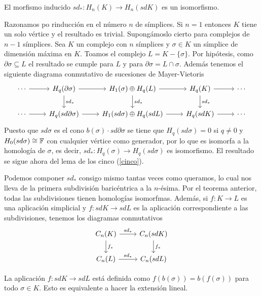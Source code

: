 \documentclass[HS.tex]{subfiles}
\begin{document}
\begin{teorema}
El morfismo inducido $sd_*:H_n(K)\to H_n(sdK)$ es un isomorfismo.
\end{teorema}
\begin{dem}
Razonamos po rinducción en el número $n$ de símplices. Si $n=1$ entonces $K$ tiene un solo vértice y el resultado es trivial. Supongámoslo cierto para complejos de $n-1$ símplices. Sea $K$ un complejo con $n$ símplices y $\sigma\in K$ un símplice de dimensión máxima en $K$. Toamos el complejo $L=K-\{\sigma\}$. Por hipótesis, como $\partial\sigma\subseteq L$ el resultado se cumple para $L$ y para $\partial\sigma=L\cap\sigma$. Además tenemos el siguiente diagrama conmutativo de sucesiones de Mayer-Vietoris
\[
\begin{tikzcd}
\cdots\arrow[r] & H_q(\partial\sigma)\arrow[r]\arrow[d,"sd_*"] & H_1(\sigma)\oplus H_q(L)\arrow[r]\arrow[d, "sd_*"] & H_q(K)\arrow[d, "sd_*"]\arrow[r]&\cdots \\
\cdots\arrow[r] & H_q(sd\partial\sigma)\arrow[r]& H_1(sd\sigma)\oplus H_q(sdL)\arrow[r] & H_q(sdK)\arrow[r]&\cdots 
\end{tikzcd}
\]
Puesto que $sd\sigma$ es el cono $b(\sigma)\cdot sd\partial\sigma$ se tiene que $H_q(sd\sigma)=0$ si $q\neq 0$ y $H_0(sd\sigma)\cong\mathbb{F}$ con cualquier vértice como generador, por lo que es isomorfa a la homología de $\sigma$, es decir, $sd_*:H_q(\sigma)\to H_q(sd\sigma)$ es isomorfismo. El resultado se sigue ahora del lema de los cinco (\ref{cinco}). 
\QED
\end{dem}



\begin{observacion} Podemos componer $sd_*$ consigo mismo tantas veces como queramos, lo cual nos lleva de la primera subdivisión baricéntrica a la $n$-ésima. Por el teorema anterior, todas las subdivisiones tienen homologías isomorfmas. Además, si $f:K\to L$ es una aplicación simplicial y $f:sdK\to sdL$ es la aplicación correspondiente a las subdivisiones, tenemos los diagramas conmutativos 
\[
\begin{tikzcd}
C_n(K)\arrow[r,"sd_*"]\arrow[d,"f_*"] & C_n(sdK)\arrow[d,"f_*"]\\
C_n(L)\arrow[r,"sd_*"] & C_n(sdL)
\end{tikzcd}
\]


La aplicación $f:sdK\to sdL$ está definida como $f(b(\sigma))=b(f(\sigma))$ para todo $\sigma\in K$. Esto es equivalente a hacer la extensión lineal.


\end{observacion}
\end{document}
